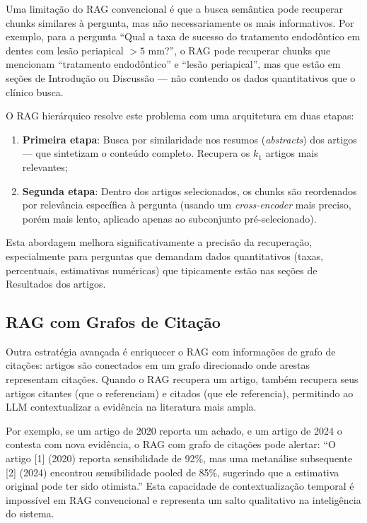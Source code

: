 Uma limitação do RAG convencional é que a busca semântica pode recuperar chunks similares à pergunta, mas não necessariamente os mais informativos. Por exemplo, para a pergunta ``Qual a taxa de sucesso do tratamento endodôntico em dentes com lesão periapical $>5$ mm?'', o RAG pode recuperar chunks que mencionam ``tratamento endodôntico'' e ``lesão periapical'', mas que estão em seções de Introdução ou Discussão --- não contendo os dados quantitativos que o clínico busca.

O RAG hierárquico resolve este problema com uma arquitetura em duas etapas:
\begin{enumerate}
    \item \textbf{Primeira etapa}: Busca por similaridade nos resumos (\textit{abstracts}) dos artigos --- que sintetizam o conteúdo completo. Recupera os $k_1$ artigos mais relevantes;
    \item \textbf{Segunda etapa}: Dentro dos artigos selecionados, os chunks são reordenados por relevância específica à pergunta (usando um \textit{cross-encoder} mais preciso, porém mais lento, aplicado apenas ao subconjunto pré-selecionado).
\end{enumerate}

Esta abordagem melhora significativamente a precisão da recuperação, especialmente para perguntas que demandam dados quantitativos (taxas, percentuais, estimativas numéricas) que tipicamente estão nas seções de Resultados dos artigos.

\subsection{RAG com Grafos de Citação}

Outra estratégia avançada é enriquecer o RAG com informações de grafo de citações: artigos são conectados em um grafo direcionado onde arestas representam citações. Quando o RAG recupera um artigo, também recupera seus artigos citantes (que o referenciam) e citados (que ele referencia), permitindo ao LLM contextualizar a evidência na literatura mais ampla.

Por exemplo, se um artigo de 2020 reporta um achado, e um artigo de 2024 o contesta com nova evidência, o RAG com grafo de citações pode alertar: ``O artigo [1] (2020) reporta sensibilidade de 92\%, mas uma metanálise subsequente [2] (2024) encontrou sensibilidade pooled de 85\%, sugerindo que a estimativa original pode ter sido otimista.'' Esta capacidade de contextualização temporal é impossível em RAG convencional e representa um salto qualitativo na inteligência do sistema.

